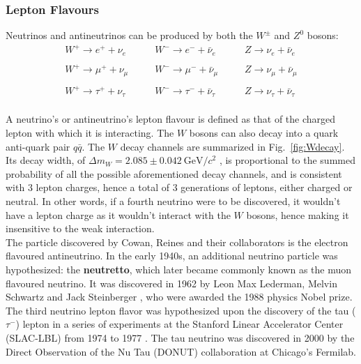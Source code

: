 \subsubsection{Lepton Flavours}

Neutrinos and antineutrinos can be produced by both the $W^{\pm}$ and $Z^0$ bosons:
\begin{equation}
\begin{array}{lcccr}
W^{+} \longrightarrow e^{+} + \nu_e & ~~~~~ & W^{-} \longrightarrow e^{-} + \bar{\nu}_e & ~~~~~ & Z \longrightarrow \nu_e + \bar{\nu}_e \\
\\
W^{+} \longrightarrow \mu^{+} + \nu_\mu & ~~~~~ & W^{-} \longrightarrow \mu^{-} + \bar{\nu}_\mu & ~~~~~ & Z \longrightarrow \nu_\mu + \bar{\nu}_\mu \\
\\
W^{+} \longrightarrow \tau^{+} + \nu_\tau & ~~~~~ & W^{-} \longrightarrow \tau^{-} + \bar{\nu}_\tau & ~~~~~ & Z \longrightarrow \nu_\tau + \bar{\nu}_\tau
\end{array}
\end{equation} \\ A neutrino's or antineutrino's lepton flavour is defined as that of the charged lepton with which it is interacting. The $W$ bosons can also decay into a quark anti-quark pair $q\bar{q}$. The $W$ decay channels are summarized in Fig.~\ref{fig:Wdecay}. Its decay width, of $\Delta m_W = 2.085 \pm 0.042~\mathrm{GeV}/c^2$ \citep{W_decay_width}, is proportional to the summed probability of all the possible aforementioned decay channels, and is consistent with $3$ lepton charges, hence a total of $3$ generations of leptons, either charged or neutral. In other words, if a fourth neutrino were to be discovered, it wouldn't have a lepton charge as it wouldn't interact with the $W$ bosons, hence making it insensitive to the weak interaction. \\

The particle discovered by Cowan, Reines and their collaborators is the electron flavoured antineutrino. In the early 1940s, an additional neutrino particle was hypothesized: the \textbf{neutretto}, which later became commonly known as the muon flavoured neutrino. It was discovered in 1962 by Leon Max Lederman, Melvin Schwartz and Jack Steinberger \citep{nu_mu_discovery}, who were awarded the 1988 physics Nobel prize. The third neutrino lepton flavor was hypothesized upon the discovery of the tau ($\tau^{-}$) lepton in a series of experiments at the Stanford Linear Accelerator Center (SLAC-LBL) from 1974 to 1977 \citep{tau_discovery}. The tau neutrino was discovered in 2000 by the Direct Observation of the Nu Tau (DONUT) collaboration \citep{nu_tau_discovery} at Chicago's Fermilab. \\

